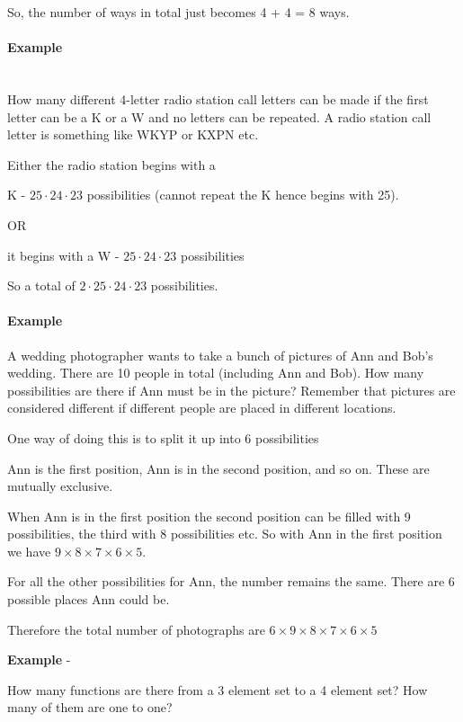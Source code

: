 \documentclass[12pt]{article}
\begin{document}
So, the number of ways in total just becomes 4 + 4 = 8 ways.

\paragraph{Example}~\\ 

How many different 4-letter radio station call letters can be made if the first letter can be a K or a W and no letters can be repeated. A radio station call letter is something like WKYP or KXPN etc.

Either the radio station begins with a 

K - $25 \cdot 24 \cdot 23$ possibilities (cannot repeat the K hence begins with 25).

OR

it begins with a W - $25 \cdot 24 \cdot 23$ possibilities

So a total of $2 \cdot 25 \cdot 24 \cdot 23$ possibilities.

\paragraph{Example}

A wedding photographer wants to take a  bunch of pictures of Ann and Bob's wedding. There are 10 people in total (including Ann and Bob). How many possibilities are there if Ann must be in the picture? Remember that pictures are considered different if different people are placed in different locations.

\medskip

One way of doing this is to split it up into 6 possibilities

Ann is the first position, Ann is in the second position, and so on. These are mutually exclusive.

When Ann is in the first position the second position can be filled with 9 possibilities, the third with 8 possibilities etc. So with Ann in the first position we have 
$9 \times 8 \times 7 \times 6 \times 5$.

For all the other possibilities for Ann, the number remains the same. There are 6 possible places Ann could be. 

Therefore the total number of photographs are $6 \times 9 \times 8 \times 7 \times 6 \times 5$

\medskip

\textbf{Example} - 

How many functions are there from a 3 element set to a 4 element set? How many of them are one to one?
\end{document}
